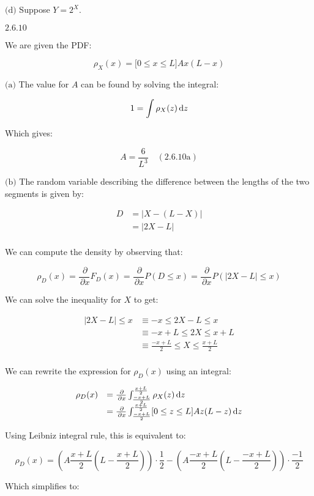\documentclass{article}
\newcommand{\problem}[2]{$\boxed{\text{#1.#2}}$}
\newcommand{\subproblem}[3]{$\boxed{\text{(#3)}}$}
\newcommand{\subsolution}[4]{\boxed{#4\quad(\text{#1.#2#3})}}
\renewcommand{\d}[1]{\,\textnormal{d}#1}
\newcommand{\p}[1]{\,\partial #1}
\newcommand{\pp}[2]{\frac{\p{#1}}{\p{#2}}}
\begin{document}
%
\subproblem{2.6}{8}{d} Suppose $Y=2^X$.

%
\problem{2.6}{10}

We are given the PDF:

\[
\rho_X(x)=\lbrack0\le x\le L\rbrack Ax(L-x)
\]

%
\subproblem{2.6}{10}{a} The value for $A$ can be found by solving the
integral:

\[
1=\int \rho_X(z)\d{z}
\]

Which gives:

\[
\subsolution{2.6}{10}{a}{A=\frac{6}{L^3}}
\]

%
\subproblem{2.6}{10}{b} The random variable describing the difference
between the lengths of the two segments is given by:

\[
\begin{array}{rl}
D&=|X - (L - X)| \\
&=|2X - L| \\
\end{array}
\]

We can compute the density by observing that:

\[
\rho_D(x)=\pp{}{x} F_D(x) = \pp{}{x}P(D\le x) = \pp{}{x}P(|2X-L|\le x)
\]

We can solve the inequality for $X$ to get:

\[
\begin{array}{rl}
|2X-L|\le x &\equiv -x \le 2X-L\le x \\
&\equiv -x+L\le 2X\le x+L \\
&\equiv \frac{-x+L}{2}\le X\le \frac{x+L}{2} \\
\end{array}
\]

We can rewrite the expression for $\rho_D(x)$ using an integral:

\[
\begin{array}{rl}
\rho_D(x)&=\pp{}{x} \int_{\frac{-x+L}{2}}^{\frac{x+L}{2}} \rho_X(z)\d{z} \\
&=\pp{}{x} \int_{\frac{-x+L}{2}}^{\frac{x+L}{2}} \lbrack0\le z\le L\rbrack Az(L-z)\d{z} \\
\end{array}
\]

Using Leibniz integral rule, this is equivalent to:

\[
\rho_D(x)=\left(A\frac{x+L}{2}\left(L-\frac{x+L}{2}\right)\right)\cdot\frac{1}{2} - \left(A\frac{-x+L}{2}\left(L-\frac{-x+L}{2}\right)\right)\cdot\frac{-1}{2}
\]

Which simplifies to:
\end{document}
